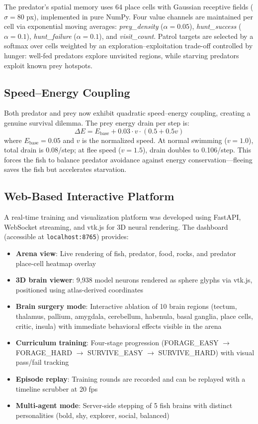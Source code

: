 \documentclass[11pt,a4paper]{article}
\begin{document}
The predator's spatial memory uses 64 place cells with Gaussian receptive fields ($\sigma = 80$ px), implemented in pure NumPy. Four value channels are maintained per cell via exponential moving averages: \textit{prey\_density} ($\alpha=0.05$), \textit{hunt\_success} ($\alpha=0.1$), \textit{hunt\_failure} ($\alpha=0.1$), and \textit{visit\_count}. Patrol targets are selected by a softmax over cells weighted by an exploration--exploitation trade-off controlled by hunger: well-fed predators explore unvisited regions, while starving predators exploit known prey hotspots.

\subsection{Speed--Energy Coupling}

Both predator and prey now exhibit quadratic speed--energy coupling, creating a genuine survival dilemma. The prey energy drain per step is:
\[
\Delta E = E_{\text{base}} + 0.03 \cdot v \cdot (0.5 + 0.5v)
\]
where $E_{\text{base}} = 0.05$ and $v$ is the normalized speed. At normal swimming ($v=1.0$), total drain is 0.08/step; at flee speed ($v=1.5$), drain doubles to 0.106/step. This forces the fish to balance predator avoidance against energy conservation---fleeing saves the fish but accelerates starvation.

\subsection{Web-Based Interactive Platform}

A real-time training and visualization platform was developed using FastAPI, WebSocket streaming, and vtk.js for 3D neural rendering. The dashboard (accessible at \texttt{localhost:8765}) provides:
\begin{itemize}
\item \textbf{Arena view}: Live rendering of fish, predator, food, rocks, and predator place-cell heatmap overlay
\item \textbf{3D brain viewer}: 9,938 model neurons rendered as sphere glyphs via vtk.js, positioned using atlas-derived coordinates
\item \textbf{Brain surgery mode}: Interactive ablation of 10 brain regions (tectum, thalamus, pallium, amygdala, cerebellum, habenula, basal ganglia, place cells, critic, insula) with immediate behavioral effects visible in the arena
\item \textbf{Curriculum training}: Four-stage progression (FORAGE\_EASY $\to$ FORAGE\_HARD $\to$ SURVIVE\_EASY $\to$ SURVIVE\_HARD) with visual pass/fail tracking
\item \textbf{Episode replay}: Training rounds are recorded and can be replayed with a timeline scrubber at 20 fps
\item \textbf{Multi-agent mode}: Server-side stepping of 5 fish brains with distinct personalities (bold, shy, explorer, social, balanced)
\end{itemize}
\end{document}
